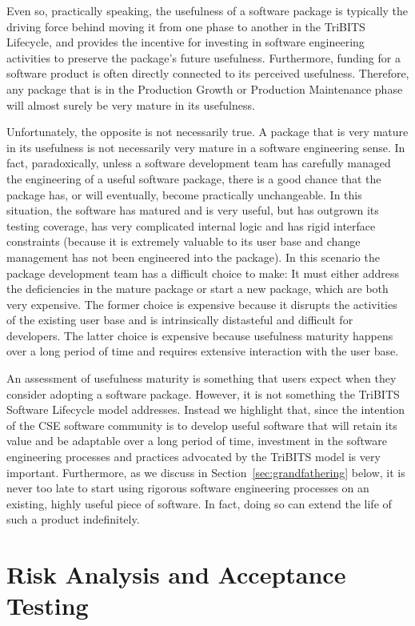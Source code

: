 \documentclass[11pt]{SANDreport}
\begin{document}
Even so, practically speaking, the usefulness of a software package is typically the driving force behind moving it from one phase to another in the TriBITS Lifecycle, and provides the incentive for investing in software engineering activities to preserve the package's future usefulness.  Furthermore, funding for a software product is often directly connected to its perceived usefulness.  Therefore, any package that is in the Production Growth or Production Maintenance phase will almost surely be very mature in its usefulness.

Unfortunately, the opposite is not necessarily true.  A package that is very mature in its usefulness is not necessarily very mature in a software engineering sense.  In fact, paradoxically, unless a software development team has carefully managed the engineering of a useful software package, there is a good chance that the package has, or will eventually, become practically unchangeable.  In this situation, the software has matured and is very useful, but has outgrown its testing coverage, has very complicated internal logic and has rigid interface constraints (because it is extremely valuable to its user base and change management has not been engineered into the package).  In this scenario the package development team has a difficult choice to make: It must either address the deficiencies in the mature package or start a new package, which are both very expensive.  The former choice is expensive because it disrupts the activities of the existing user base and is intrinsically distasteful and difficult for developers.  The latter choice is expensive because usefulness maturity happens over a long period of time and requires extensive interaction with the user base.

An assessment of usefulness maturity is something that users expect when they consider adopting a software package.  However, it is not something the TriBITS Software Lifecycle model addresses.  Instead we highlight that, since the intention of the CSE software community is to develop useful software that will retain its value and be adaptable over a long period of time, investment in the software engineering processes and practices advocated by the TriBITS model is very important.  Furthermore, as we discuss in Section~\ref{sec:grandfathering} below, it is never too late to start using rigorous software engineering processes on an existing, highly useful piece of software.  In fact, doing so can extend the life of such a product indefinitely.

%
{}\section{Risk Analysis and Acceptance Testing}
\label{sec:risk_analysis_acceptance_testing}
%
\end{document}
